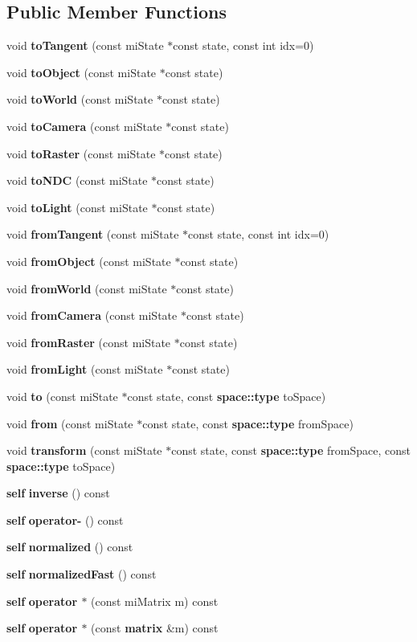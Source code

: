 \subsection*{Public Member Functions}
\begin{CompactItemize}
\item 
void {\bf to\-Tangent} (const mi\-State $\ast$const state, const int idx=0)
\item 
void {\bf to\-Object} (const mi\-State $\ast$const state)
\item 
void {\bf to\-World} (const mi\-State $\ast$const state)
\item 
void {\bf to\-Camera} (const mi\-State $\ast$const state)
\item 
void {\bf to\-Raster} (const mi\-State $\ast$const state)
\item 
void {\bf to\-NDC} (const mi\-State $\ast$const state)
\item 
void {\bf to\-Light} (const mi\-State $\ast$const state)
\item 
void {\bf from\-Tangent} (const mi\-State $\ast$const state, const int idx=0)
\item 
void {\bf from\-Object} (const mi\-State $\ast$const state)
\item 
void {\bf from\-World} (const mi\-State $\ast$const state)
\item 
void {\bf from\-Camera} (const mi\-State $\ast$const state)
\item 
void {\bf from\-Raster} (const mi\-State $\ast$const state)
\item 
void {\bf from\-Light} (const mi\-State $\ast$const state)
\item 
void {\bf to} (const mi\-State $\ast$const state, const {\bf space::type} to\-Space)
\item 
void {\bf from} (const mi\-State $\ast$const state, const {\bf space::type} from\-Space)
\item 
void {\bf transform} (const mi\-State $\ast$const state, const {\bf space::type} from\-Space, const {\bf space::type} to\-Space)
\item 
{\bf self} {\bf inverse} () const 
\item 
{\bf self} {\bf operator-} () const 
\item 
{\bf self} {\bf normalized} () const 
\item 
{\bf self} {\bf normalized\-Fast} () const 
\item 
{\bf self} {\bf operator $\ast$} (const mi\-Matrix m) const 
\item 
{\bf self} {\bf operator $\ast$} (const {\bf matrix} \&m) const 
\end{CompactItemize}
